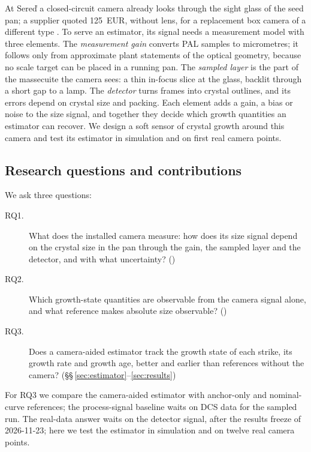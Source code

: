 At Sere\v{d} a closed-circuit camera already looks through the sight glass of the seed pan; a supplier quoted
125~EUR, without lens, for a replacement box camera of a different type \citep{PolzQuote2025}. To serve an
estimator, its signal needs a measurement model with three elements. The \emph{measurement gain} converts PAL samples
to micrometres; it follows only from approximate plant statements of the optical geometry, because no scale target
can be placed in a running pan. The \emph{sampled layer} is the part of the massecuite the camera sees: a thin
in-focus slice at the glass, backlit through a short gap to a lamp. The \emph{detector} turns frames into crystal
outlines, and its errors depend on crystal size and packing. Each element adds a gain, a bias or noise to the size
signal, and together they decide which growth quantities an estimator can recover. We design a soft sensor of crystal
growth around this camera and test its estimator in simulation and on first real camera points.

\subsection{Research questions and contributions}\label{sec:rq}

We ask three questions:
\begin{description}
\item[RQ1.] What does the installed camera measure: how does its size signal depend on the crystal size in the pan
through the gain, the sampled layer and the detector, and with what uncertainty? ()
\item[RQ2.] Which growth-state quantities are observable from the camera signal alone, and what reference makes
absolute size observable? ()
\item[RQ3.] Does a camera-aided estimator track the growth state of each strike, its growth rate and growth age,
better and earlier than references without the camera? (\S\S\,\ref{sec:estimator}--\ref{sec:results})
\end{description}
For RQ3 we compare the camera-aided estimator with anchor-only and nominal-curve references; the process-signal
baseline waits on DCS data for the sampled run. The real-data answer waits on the detector signal, after the results
freeze of 2026-11-23; here we test the estimator in simulation and on twelve real camera points.

